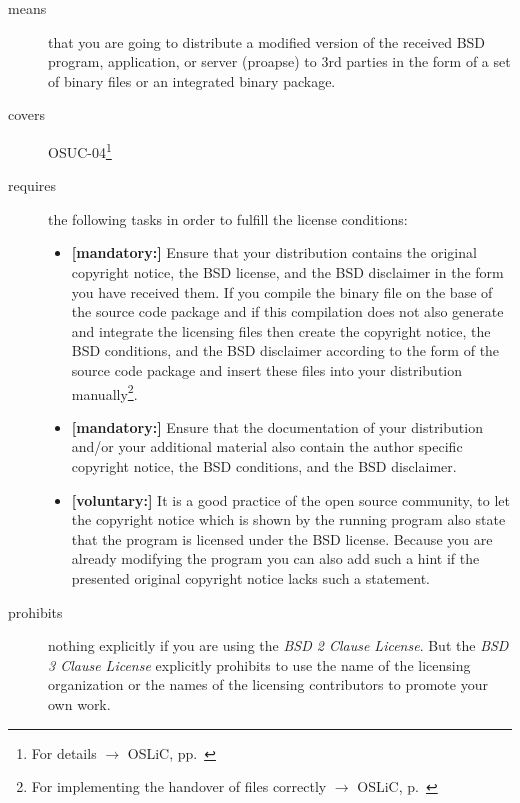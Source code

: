 \begin{description}
\item[means] that you are going to distribute a modified version of the received
BSD pro\-gram, application, or server (proapse) to 3rd parties in the form of a set
of binary files or an integrated binary package.
\item[covers] OSUC-04\footnote{For details $\rightarrow$ OSLiC, pp.\ \pageref{OSUC-04-DEF}}
\item[requires] the following tasks in order to fulfill the license conditions:
\begin{itemize}

  \item  \textbf{[mandatory:]} Ensure that your distribution contains the
  original copyright notice, the BSD license, and the BSD disclaimer in the form
  you have received them. If you compile the binary file on the base of the
  source code package and if this compilation does not also generate and
  integrate the licensing files then create the copyright notice, the BSD
  conditions, and the BSD disclaimer according to the form of the source code
  package and insert these files into your distribution manually\footnote{For
  implementing the handover of files correctly $\rightarrow$ OSLiC, p.\ 
  \pageref{DistributingFilesHint}}.

  \item  \textbf{[mandatory:]} Ensure that the documentation of your
  distribution and/or your additional material also contain the author specific
  copyright notice, the BSD conditions, and the BSD disclaimer.
  
  \item \textbf{[voluntary:]} It is a good practice of the open source
  community, to let the copyright notice which is shown by the running program
  also state that the program is licensed under the BSD license. Because you are
  already modifying the program you can also add such a hint if the presented
  original copyright notice lacks such a statement.
\end{itemize}

\item[prohibits] nothing explicitly if you are using the \emph{BSD 2 Clause
License}. But the \emph{BSD 3 Clause License} explicitly prohibits to use the
name of the licensing organization or the names of the licensing contributors to
promote your own work.

\end{description}

